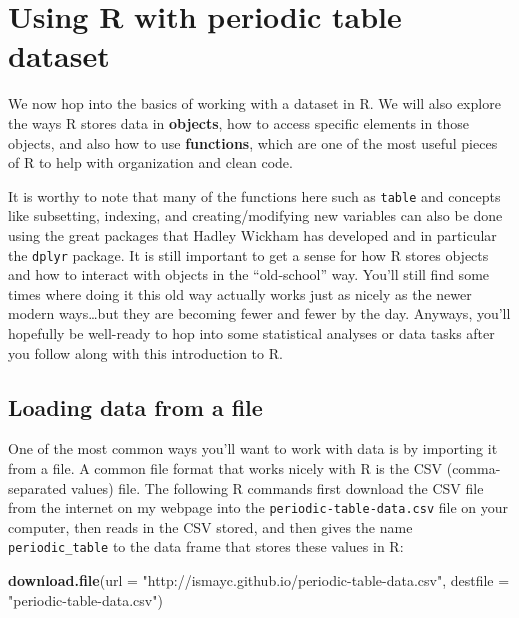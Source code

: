\documentclass[]{tufte-book}
\newenvironment{Shaded}{\begin{snugshade}}{\end{snugshade}}
\newcommand{\KeywordTok}[1]{\textcolor[rgb]{0.13,0.29,0.53}{\textbf{{#1}}}}
\newcommand{\DataTypeTok}[1]{\textcolor[rgb]{0.13,0.29,0.53}{{#1}}}
\newcommand{\StringTok}[1]{\textcolor[rgb]{0.31,0.60,0.02}{{#1}}}
\newcommand{\NormalTok}[1]{{#1}}
\theoremstyle{definition}
\theoremstyle{definition}
\theoremstyle{remark}
\begin{document}
\section{Using R with periodic table
dataset}\label{using-r-with-periodic-table-dataset}

We now hop into the basics of working with a dataset in R. We will also
explore the ways R stores data in \textbf{objects}, how to access
specific elements in those objects, and also how to use
\textbf{functions}, which are one of the most useful pieces of R to help
with organization and clean code.

It is worthy to note that many of the functions here such as
\texttt{table} and concepts like subsetting, indexing, and
creating/modifying new variables can also be done using the great
packages that Hadley Wickham has developed and in particular the
\texttt{dplyr} package. It is still important to get a sense for how R
stores objects and how to interact with objects in the ``old-school''
way. You'll still find some times where doing it this old way actually
works just as nicely as the newer modern ways\ldots{}but they are
becoming fewer and fewer by the day. Anyways, you'll hopefully be
well-ready to hop into some statistical analyses or data tasks after you
follow along with this introduction to R.

\subsection{Loading data from a file}\label{loading-data-from-a-file}

One of the most common ways you'll want to work with data is by
importing it from a file. A common file format that works nicely with R
is the CSV (comma-separated values) file. The following R commands first
download the CSV file from the internet on my webpage into the
\texttt{periodic-table-data.csv} file on your computer, then reads in
the CSV stored, and then gives the name \texttt{periodic\_table} to the
data frame that stores these values in R:

\begin{Shaded}
\begin{Highlighting}[]
\KeywordTok{download.file}\NormalTok{(}\DataTypeTok{url =} \StringTok{"http://ismayc.github.io/periodic-table-data.csv"}\NormalTok{, }
  \DataTypeTok{destfile =} \StringTok{"periodic-table-data.csv"}\NormalTok{)}
\end{Highlighting}
\end{Shaded}
\end{document}
